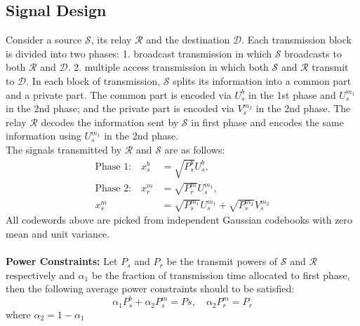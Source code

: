 \documentclass[titlepage]{article}
\begin{document}
\subsection{Signal Design}
Consider a source $\mathcal{S}$, its relay $\mathcal{R}$ and the destination $\mathcal{D}$. Each transmission block is divided into two phases: 1. broadcast transmission in which $\mathcal{S}$ broadcasts to both $\mathcal{R}$ and $\mathcal{D}$. 2. multiple access transmission in which both $\mathcal{S}$ and $\mathcal{R}$ transmit to $\mathcal{D}$. In each block of transmission, $\mathcal{S}$ splits its information into a common part and a private part. The common part is encoded via $U_s^b$ in the 1st phase and $U_s^{m_1}$ in the 2nd phase; and the private part is encoded via $V_s^{m_2}$ in the 2nd phase. The relay $\mathcal{R}$ decodes the information sent by $\mathcal{S}$ in first phase and encodes the same information using $U_s^{m_1}$ in the 2nd phase. \\ 
The signals transmitted by $\mathcal{R}$ and $\mathcal{S}$ are as follows:
\begin{align}
\text{Phase 1:}\quad x^b_s &= \sqrt{P_s^b} U_s^b, \label{eq:tranSig1}\\
\text{Phase 2:}\quad x_r^m &= \sqrt{P_r^m}U_s^{m_1}, \label{eq:tranSig2}\\ 
 x^m_s &= \sqrt{P_s^{m_1}}U_s^{m_1} + \sqrt{P_s^{m_2}}V_s^{m_2} \label{eq:tranSig3}
\end{align}
All codewords above are picked from independent Gaussian codebooks with zero mean and unit variance. \\ \\
\textbf{Power Constraints:} Let $P_s$ and $P_r$ be the transmit powers of $\mathcal{S}$ and $\mathcal{R}$ respectively and $\alpha_1$ be the fraction of transmission time allocated to first phase, then the following average power constraints should to be satisfied:
\begin{equation}
\alpha_1 P_s^b + \alpha_2 P_s^m = Ps,\quad \alpha_2P_r^m = P_r
\end{equation}
where $\alpha_2 = 1-\alpha_1$
\end{document}
